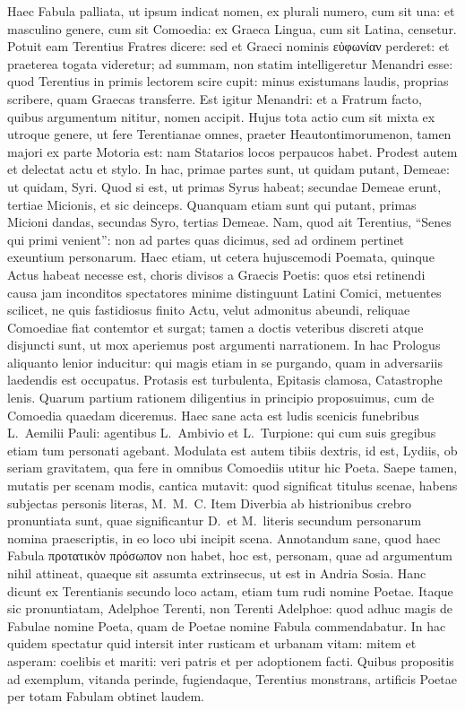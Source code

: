 {\large
Haec Fabula palliata, ut ipsum indicat nomen, ex plurali numero, cum sit una: et masculino genere, cum sit Comoedia: ex Graeca Lingua, cum sit Latina, censetur. Potuit eam Terentius Fratres dicere: sed et Graeci nominis εὐφωνίαν perderet: et praeterea togata videretur; ad summam, non statim intelligeretur Menandri esse: quod Terentius in primis lectorem scire cupit: minus existumans laudis, proprias scribere, quam Graecas transferre. Est igitur Menandri: et a Fratrum facto, quibus argumentum nititur, nomen accipit. Hujus tota actio cum sit mixta ex utroque genere, ut fere Terentianae omnes, praeter Heautontimorumenon, tamen majori ex parte Motoria est: nam Statarios locos perpaucos habet. Prodest autem et delectat actu et stylo. In hac, primae partes sunt, ut quidam putant, Demeae: ut quidam, Syri. Quod si est, ut primas Syrus habeat; secundae Demeae erunt, tertiae Micionis, et sic deinceps. Quanquam etiam sunt qui putant, primas Micioni dandas, secundas Syro, tertias Demeae. Nam, quod ait Terentius, ``Senes qui primi venient'': non ad partes quas dicimus, sed ad ordinem pertinet exeuntium personarum. Haec etiam, ut cetera hujuscemodi Poemata, quinque Actus habeat necesse est, choris divisos a Graecis Poetis: quos etsi retinendi causa jam inconditos spectatores minime distinguunt Latini Comici, metuentes scilicet, ne quis fastidiosus finito Actu, velut admonitus abeundi, reliquae Comoediae fiat contemtor et surgat; tamen a doctis veteribus discreti atque disjuncti sunt, ut mox aperiemus post argumenti narrationem. In hac Prologus aliquanto lenior inducitur: qui magis etiam in se purgando, quam in adversariis laedendis est occupatus. Protasis est turbulenta, Epitasis clamosa, Catastrophe lenis. Quarum partium rationem diligentius in principio proposuimus, cum de Comoedia quaedam diceremus. Haec sane acta est ludis scenicis funebribus L.\ Aemilii Pauli: agentibus L.\ Ambivio et L.\ Turpione: qui cum suis gregibus etiam tum personati agebant. Modulata est autem tibiis dextris, id est, Lydiis, ob seriam gravitatem, qua fere in omnibus Comoediis utitur hic Poeta. Saepe tamen, mutatis per scenam modis, cantica mutavit: quod significat titulus scenae, habens subjectas personis literas, M.\ M.\ C. Item Diverbia ab histrionibus crebro pronuntiata sunt, quae significantur D.\ et M.\ literis secundum personarum nomina praescriptis, in eo loco ubi incipit scena. Annotandum sane, quod haec Fabula προτατικὸν πρόσωπον non habet, hoc est, personam, quae ad argumentum nihil attineat, quaeque sit assumta extrinsecus, ut est in Andria Sosia. Hanc dicunt ex Terentianis secundo loco actam, etiam tum rudi nomine Poetae. Itaque sic pronuntiatam, Adelphoe Terenti, non Terenti Adelphoe: quod adhuc magis de Fabulae nomine Poeta, quam de Poetae nomine Fabula commendabatur. In hac quidem spectatur quid intersit inter rusticam et urbanam vitam: mitem et asperam: coelibis et mariti: veri patris et per adoptionem facti. Quibus propositis ad exemplum, vitanda perinde, fugiendaque, Terentius monstrans, artificis Poetae per totam Fabulam obtinet laudem.\\

}

